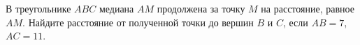 В треугольнике $ABC$ медиана $AM$ продолжена за точку $M$ на расстояние, равное $AM$. Найдите расстояние от полученной точки до вершин $B$ и $C$, если $AB = 7$, $AC = 11$.